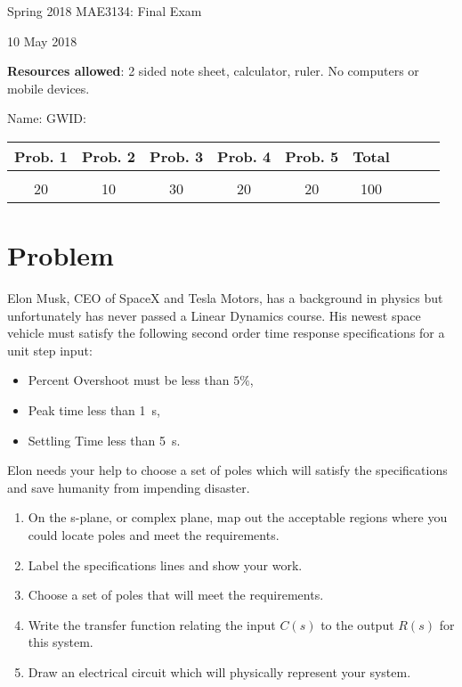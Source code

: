 \documentclass[titlepage, 11pt, reqno]{article}    %
\begin{document}
\begin{titlepage}
    \centering
    \vspace{1cm}
    {\Large Spring 2018 MAE3134: Final Exam\par }
    \vspace{3cm}
    {10 May 2018\par}
    \vspace{1cm}
    \textbf{Resources allowed}: 2 sided note sheet, calculator, ruler. 
    No computers or mobile devices.

    \vspace{1cm}
    {Name: \underline{\hspace{5cm}} \hspace{2cm} GWID:\underline{\hspace{5cm}}\par}
    \vspace{3cm}

    \begin{tabular}{|c|c|c|c|c|c|c|c|c|}
        \hline
        Prob. 1 & Prob. 2 & Prob. 3 & Prob. 4 & Prob. 5 & Total \\
        \hline
         & & & & &\\[4ex]
        \hline
        20 & 10 & 30 & 20 & 20 & 100 \\[4ex]
        \hline
    \end{tabular}
    \vfill
\end{titlepage}
\section{Problem}\label{prob:sys_response_to_poles}
Elon Musk, CEO of SpaceX and Tesla Motors, has a background in physics but unfortunately has never passed a Linear Dynamics course. 
His newest space vehicle must satisfy the following second order time response specifications for a unit step input:
\begin{itemize}
    \item Percent Overshoot must be less than \(5 \%\),
    \item Peak time less than \SI{1}{\second},
    \item Settling Time less than \SI{5}{\second}.
\end{itemize}
Elon needs your help to choose a set of poles which will satisfy the specifications and save humanity from impending disaster.
\begin{enumerate}
    \item On the s-plane, or complex plane, map out the acceptable regions where you could locate poles and meet the requirements. 
    \item Label the specifications lines and show your work.
    \item Choose a set of poles that will meet the requirements.
    \item Write the transfer function relating the input \( C(s) \) to the output \( R(s) \) for this system.
    \item Draw an electrical circuit which will physically represent your system.
\end{enumerate}
\end{document}
